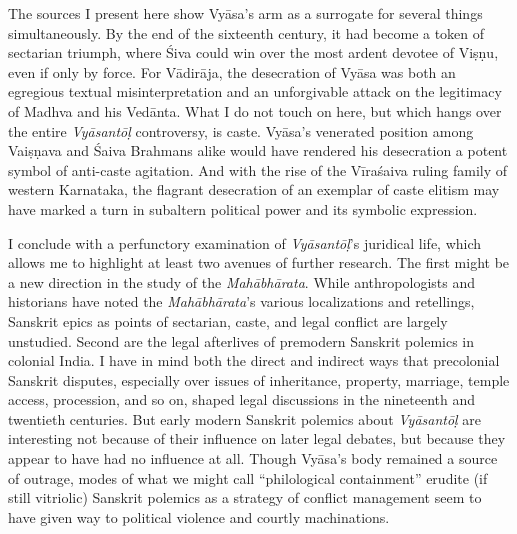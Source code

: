 The sources I present here show Vyāsa’s arm as a surrogate for several things simultaneously. By the end of the sixteenth century, it had become a token of sectarian triumph, where Śiva could win over the most ardent devotee of Viṣṇu, even if only by force. For Vādirāja, the desecration of Vyāsa was both an egregious textual misinterpretation and an unforgivable attack on the legitimacy of Madhva and his Vedānta. What I do not touch on here, but which hangs over the entire \emph{Vyāsantōḷ} controversy, is caste. Vyāsa’s venerated position among Vaiṣṇava and Śaiva Brahmans alike would have rendered his desecration a potent symbol of anti-caste agitation. And with the rise of the Vīraśaiva ruling family of western Karnataka, the flagrant desecration of an exemplar of caste elitism may have marked a turn in subaltern political power and its symbolic expression.


I conclude with a perfunctory examination of \emph{Vyāsantōḷ}’s juridical life, which allows me to highlight at least two avenues of further research. The first might be a new direction in the study of the \emph{Mahābhārata}. While anthropologists and historians have noted the \emph{Mahābhārata}’s various localizations and retellings, Sanskrit epics as points of sectarian, caste, and legal conflict are largely unstudied. Second are the legal afterlives of premodern Sanskrit polemics in colonial India. I have in mind both the direct and indirect ways that precolonial Sanskrit disputes, especially over issues of inheritance, property, marriage, temple access, procession, and so on, shaped legal discussions in the nineteenth and twentieth centuries. But early modern Sanskrit polemics about \emph{Vyāsantōḷ} are interesting not because of their influence on later legal debates, but because they appear to have had no influence at all. Though Vyāsa’s body remained a source of outrage, modes of what we might call “philological containment”  \Dash  erudite (if still vitriolic) Sanskrit polemics as a strategy of conflict management  \Dash  seem to have given way to political violence and courtly machinations.

